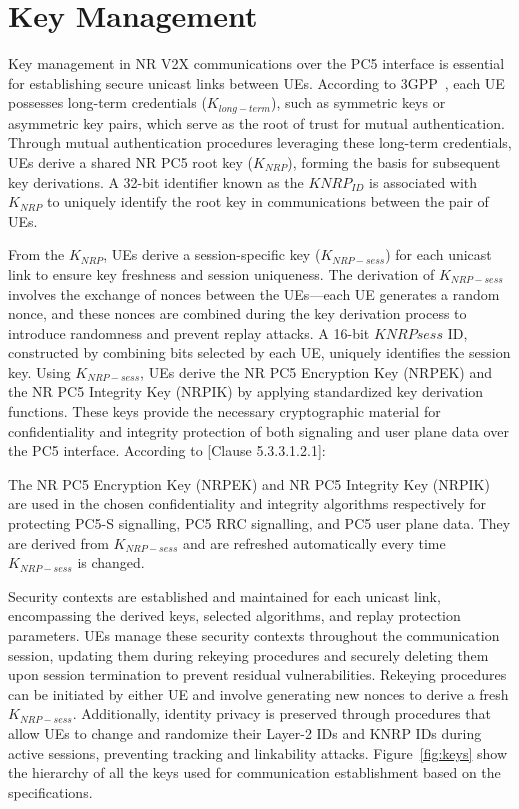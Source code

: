 \appendix

\section{Key Management} \label{sec:management}

Key management in NR V2X communications over the PC5 interface is essential for establishing secure unicast links between UEs. According to 3GPP~\cite{3gpp.33.536}, each UE possesses long-term credentials ($K_{long-term}$), such as symmetric keys or asymmetric key pairs, which serve as the root of trust for mutual authentication. Through mutual authentication procedures leveraging these long-term credentials, UEs derive a shared NR PC5 root key ($K_{NRP}$), forming the basis for subsequent key derivations. A 32-bit identifier known as the $KNRP_{ID}$ is associated with $K_{NRP}$ to uniquely identify the root key in communications between the pair of UEs.

From the $K_{NRP}$, UEs derive a session-specific key ($K_{NRP-sess}$) for each unicast link to ensure key freshness and session uniqueness. The derivation of $K_{NRP-sess}$ involves the exchange of nonces between the UEs—each UE generates a random nonce, and these nonces are combined during the key derivation process to introduce randomness and prevent replay attacks. A 16-bit $KNRP{sess}$ ID, constructed by combining bits selected by each UE, uniquely identifies the session key. Using $K_{NRP-sess}$, UEs derive the NR PC5 Encryption Key (NRPEK) and the NR PC5 Integrity Key (NRPIK) by applying standardized key derivation functions. These keys provide the necessary cryptographic material for confidentiality and integrity protection of both signaling and user plane data over the PC5 interface. According to [Clause 5.3.3.1.2.1]: 

\begin{fancyquote}[]
The NR PC5 Encryption Key (NRPEK) and NR PC5 Integrity Key (NRPIK) are used in the chosen confidentiality and integrity algorithms respectively for protecting PC5-S signalling, PC5 RRC signalling, and PC5 user plane data. They are derived from $K_{NRP-sess}$ and are refreshed automatically every time $K_{NRP-sess}$ is changed. 
\end{fancyquote}

Security contexts are established and maintained for each unicast link, encompassing the derived keys, selected algorithms, and replay protection parameters. UEs manage these security contexts throughout the communication session, updating them during rekeying procedures and securely deleting them upon session termination to prevent residual vulnerabilities. Rekeying procedures can be initiated by either UE and involve generating new nonces to derive a fresh $K_{NRP-sess}$. Additionally, identity privacy is preserved through procedures that allow UEs to change and randomize their Layer-2 IDs and KNRP IDs during active sessions, preventing tracking and linkability attacks. Figure~\ref{fig:keys} show the hierarchy of all the keys used for communication establishment based on the specifications.

